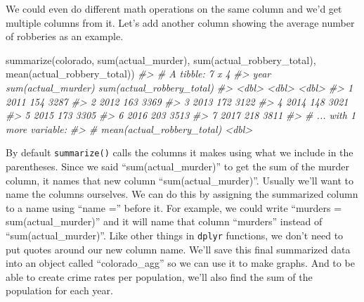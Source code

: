 \documentclass[
]{krantz}
\makeatletter
\newenvironment{Shaded}{\begin{snugshade}}{\end{snugshade}}
\newcommand{\CommentTok}[1]{\textcolor[rgb]{0.37,0.37,0.37}{\textit{#1}}}
\newcommand{\FunctionTok}[1]{\textcolor[rgb]{0,0,0}{#1}}
\newcommand{\NormalTok}[1]{#1}
\newenvironment{kframe}{%
\medskip{}
\setlength{\fboxsep}{.8em}
 \def\at@end@of@kframe{}%
 \ifinner\ifhmode%
  \def\at@end@of@kframe{\end{minipage}}%
  \begin{minipage}{\columnwidth}%
 \fi\fi%
 \def\FrameCommand##1{\hskip\@totalleftmargin \hskip-\fboxsep
 \colorbox{shadecolor}{##1}\hskip-\fboxsep
     \hskip-\linewidth \hskip-\@totalleftmargin \hskip\columnwidth}%
 \MakeFramed {\advance\hsize-\width
   \@totalleftmargin\z@ \linewidth\hsize
   \@setminipage}}%
 {\par\unskip\endMakeFramed%
 \at@end@of@kframe}
\renewenvironment{Shaded}{\begin{kframe}}{\end{kframe}}
\makeatother
\begin{document}
We could even do different math operations on the same column and we'd get multiple columns from it. Let's add another column showing the average number of robberies as an example.

\begin{Shaded}
\begin{Highlighting}[]
\FunctionTok{summarize}\NormalTok{(colorado, }\FunctionTok{sum}\NormalTok{(actual\_murder), }\FunctionTok{sum}\NormalTok{(actual\_robbery\_total), }\FunctionTok{mean}\NormalTok{(actual\_robbery\_total))}
\CommentTok{\#\textgreater{} \# A tibble: 7 x 4}
\CommentTok{\#\textgreater{}    year \textasciigrave{}sum(actual\_murder)\textasciigrave{} \textasciigrave{}sum(actual\_robbery\_total)\textasciigrave{}}
\CommentTok{\#\textgreater{}   \textless{}dbl\textgreater{}                \textless{}dbl\textgreater{}                       \textless{}dbl\textgreater{}}
\CommentTok{\#\textgreater{} 1  2011                  154                        3287}
\CommentTok{\#\textgreater{} 2  2012                  163                        3369}
\CommentTok{\#\textgreater{} 3  2013                  172                        3122}
\CommentTok{\#\textgreater{} 4  2014                  148                        3021}
\CommentTok{\#\textgreater{} 5  2015                  173                        3305}
\CommentTok{\#\textgreater{} 6  2016                  203                        3513}
\CommentTok{\#\textgreater{} 7  2017                  218                        3811}
\CommentTok{\#\textgreater{} \# ... with 1 more variable:}
\CommentTok{\#\textgreater{} \#   mean(actual\_robbery\_total) \textless{}dbl\textgreater{}}
\end{Highlighting}
\end{Shaded}

By default \texttt{summarize()} calls the columns it makes using what we include in the parentheses. Since we said ``sum(actual\_murder)'' to get the sum of the murder column, it names that new column ``sum(actual\_murder)''. Usually we'll want to name the columns ourselves. We can do this by assigning the summarized column to a name using ``name ='' before it. For example, we could write ``murders = sum(actual\_murder)'' and it will name that column ``murders'' instead of ``sum(actual\_murder)''. Like other things in \texttt{dplyr} functions, we don't need to put quotes around our new column name. We'll save this final summarized data into an object called ``colorado\_agg'' so we can use it to make graphs. And to be able to create crime rates per population, we'll also find the sum of the population for each year.
\end{document}
